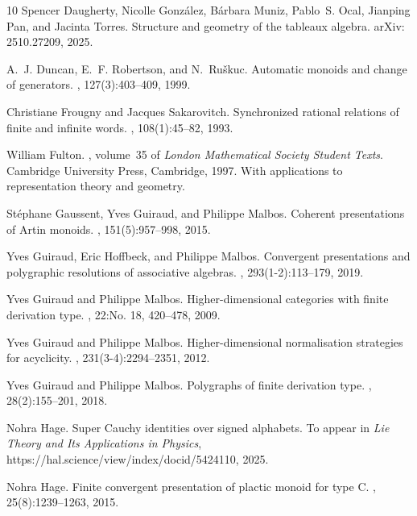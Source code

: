 \documentclass[a4paper, twoside, 11pt, english]{article}
\theoremstyle{plain}
\theoremstyle{definition}
\begin{document}
\begin{small}
\begin{thebibliography}{10}
Spencer Daugherty, Nicolle González, Bárbara Muniz, Pablo~S. Ocal, Jianping
  Pan, and Jacinta Torres.
\newblock Structure and geometry of the tableaux algebra.
\newblock arXiv: 2510.27209, 2025.

A.~J. Duncan, E.~F. Robertson, and N.~Ru\v{s}kuc.
\newblock Automatic monoids and change of generators.
, 127(3):403--409, 1999.

Christiane Frougny and Jacques Sakarovitch.
\newblock Synchronized rational relations of finite and infinite words.
, 108(1):45--82, 1993.

William Fulton.
, volume~35 of {\em London Mathematical Society
  Student Texts}.
\newblock Cambridge University Press, Cambridge, 1997.
\newblock With applications to representation theory and geometry.

St{\'e}phane Gaussent, Yves Guiraud, and Philippe Malbos.
\newblock Coherent presentations of {A}rtin monoids.
, 151(5):957--998, 2015.

Yves Guiraud, Eric Hoffbeck, and Philippe Malbos.
\newblock Convergent presentations and polygraphic resolutions of associative
  algebras.
, 293(1-2):113--179, 2019.

Yves Guiraud and Philippe Malbos.
\newblock Higher-dimensional categories with finite derivation type.
, 22:No. 18, 420--478, 2009.

Yves Guiraud and Philippe Malbos.
\newblock Higher-dimensional normalisation strategies for acyclicity.
, 231(3-4):2294--2351, 2012.

Yves Guiraud and Philippe Malbos.
\newblock Polygraphs of finite derivation type.
, 28(2):155--201, 2018.

Nohra Hage.
\newblock Super {Cauchy} identities over signed alphabets.
\newblock To appear in \emph{Lie Theory and Its Applications in Physics},
  https://hal.science/view/index/docid/5424110, 2025.

Nohra Hage.
\newblock Finite convergent presentation of plactic monoid for type {C}.
, 25(8):1239--1263, 2015.


\end{thebibliography}
\end{small}
\end{document}
